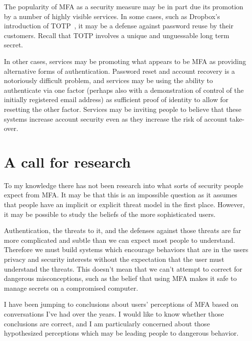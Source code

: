 \documentclass[12pt]{article}
\begin{document}
The popularity of MFA as a security measure may be in part due its promotion by a number of highly visible services.
In some cases,
such as Dropbox's introduction of TOTP~\autocite{Dropbox12:reuse},
it may be a defense against password reuse by their customers.
Recall that TOTP involves a unique and unguessable long term secret.

In other cases, services may be promoting what appears to be MFA as providing
alternative forms of authentication. 
Password reset and account recovery is a notoriously difficult problem,
and services may be using the ability to authenticate via one factor 
(perhaps also with a demonstration of control of the initially registered email address)
as sufficient proof of identity to allow for resetting the other factor.
Services may be inviting people to believe that these systems increase account security even as they increase the risk of account take-over.

\section{A call for research}

To my knowledge there has not been research into what sorts of security people expect from MFA\@.
It may be that this is an impossible question as it assumes that people
have an implicit or explicit threat model in the first place.
However, it may be possible to study the beliefs of the more sophisticated users.

Authentication, the threats to it, and the defenses against those threats are far more complicated and subtle than we can expect most people to understand.
Therefore we must build systems which encourage behaviors that are in the users
privacy and security interests without the expectation that the user must understand the threats.
This doesn't mean that we can't attempt to correct for dangerous misconceptions,
such as the belief that using MFA makes it safe to manage secrets on a compromised computer.

I have been jumping to conclusions about users' perceptions of MFA based on 
conversations I've had over the years.
I would like to know whether those conclusions are correct,
and I am particularly concerned about those hypothesized perceptions which may be leading
people to dangerous behavior.

\printbibliography
\end{document}
